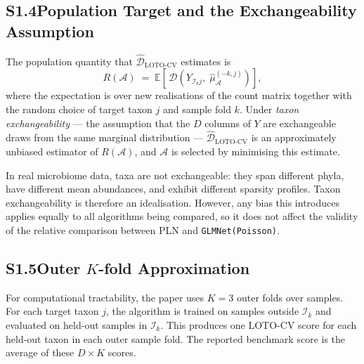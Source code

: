 \subsection*{S1.4\quad Population Target and the Exchangeability Assumption}

The population quantity that $\widehat{\mathcal{D}}_{\mathrm{LOTO}\text{-}\mathrm{CV}}$ estimates is
\[
  R(\mathcal{A})
  \;=\;
  \mathbb{E}\!\left[\,\mathcal{D}\!\left(Y_{\mathcal{I}_k j},\; \hat{\mu}^{(-k,j)}_{\mathcal{A}}\right)\right],
\]
where the expectation is over new realisations of the count matrix together with the random choice of target taxon $j$ and sample fold $k$.
Under \emph{taxon exchangeability} --- the assumption that the $D$ columns of $Y$ are exchangeable draws from the same marginal distribution --- $\widehat{\mathcal{D}}_{\mathrm{LOTO}\text{-}\mathrm{CV}}$ is an approximately unbiased estimator of $R(\mathcal{A})$, and $\mathcal{A}$ is selected by minimising this estimate.

In real microbiome data, taxa are not exchangeable: they span different phyla, have different mean abundances, and exhibit different sparsity profiles.
Taxon exchangeability is therefore an idealisation.
However, any bias this introduces applies equally to all algorithms being compared, so it does not affect the validity of the relative comparison between PLN and \texttt{GLMNet(Poisson)}.

\subsection*{S1.5\quad Outer $K$-fold Approximation}

For computational tractability, the paper uses $K = 3$ outer folds over samples.
For each target taxon $j$, the algorithm is trained on samples outside $\mathcal{I}_k$ and evaluated on held-out samples in $\mathcal{I}_k$.
This produces one LOTO-CV score for each held-out taxon in each outer sample fold.
The reported benchmark score is the average of these $D \times K$ scores.

\clearpage
